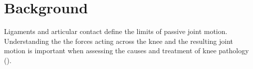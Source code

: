 \label{Introduction}
\section{Background}
Ligaments and articular contact define the limits of passive joint motion. Understanding the the forces acting across the knee and the resulting joint motion is important when assessing the causes and treatment of knee pathology \citep{thelen_co-simulation_2014} ().

